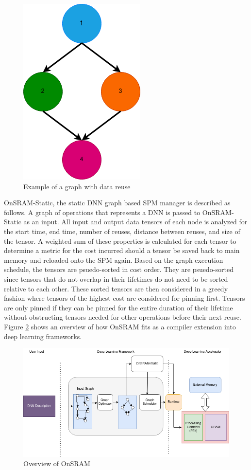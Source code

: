 \begin{figure}[thb!]
\centering
\includegraphics[scale=0.7]{Figures/reuse_example_graph.png}
\decoRule
\caption[reuseGraph]{Example of a graph with data reuse}
\label{fig:reuseGraph}
\end{figure}

OnSRAM-Static, the static DNN graph based SPM manager is described as follows.
A graph of operations that represents a DNN is passed to OnSRAM-Static as an
input. All input and output data tensors of each node is analyzed for the start
time, end time, number of reuses, distance between reuses, and size of the
tensor. A weighted sum of these properties is calculated for each tensor to
determine a metric for the cost incurred should a tensor be saved back to main
memory and reloaded onto the SPM again. Based on the graph execution schedule,
the tensors are psuedo-sorted in cost order. They are psuedo-sorted since
tensors that do not overlap in their lifetimes do not need to be sorted relative to
each other. These sorted tensors are then considered in a greedy fashion where
tensors of the highest cost are considered for pinning first. Tensors are only
pinned if they can be pinned for the entire duration of their lifetime without
obstructing tensors needed for other operations before their next reuse. Figure
\ref{fig:onsram_stack} shows an overview of how OnSRAM fits as a compiler extension
into deep learning frameworks.

\begin{figure}[thb]
\centering
\includegraphics[scale=0.5]{Figures/onsram_stack.png}
\decoRule
\caption[onsramStack]{Overview of OnSRAM}
\label{fig:onsram_stack}
\end{figure}


